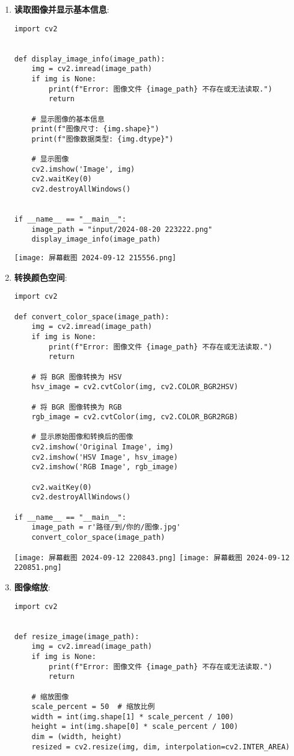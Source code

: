 \documentclass{ctexart}
\begin{document}
\begin{enumerate}[label=\arabic*.]
\item \textbf{读取图像并显示基本信息}:
\begin{lstlisting}
import cv2


def display_image_info(image_path):
    img = cv2.imread(image_path)
    if img is None:
        print(f"Error: 图像文件 {image_path} 不存在或无法读取.")
        return

    # 显示图像的基本信息
    print(f"图像尺寸: {img.shape}")
    print(f"图像数据类型: {img.dtype}")

    # 显示图像
    cv2.imshow('Image', img)
    cv2.waitKey(0)
    cv2.destroyAllWindows()


if __name__ == "__main__":
    image_path = "input/2024-08-20 223222.png"
    display_image_info(image_path)
\end{lstlisting}
\texttt{[image: 屏幕截图 2024-09-12 215556.png]}
\item \textbf{转换颜色空间}:
\begin{lstlisting}
import cv2

def convert_color_space(image_path):
    img = cv2.imread(image_path)
    if img is None:
        print(f"Error: 图像文件 {image_path} 不存在或无法读取.")
        return
    
    # 将 BGR 图像转换为 HSV
    hsv_image = cv2.cvtColor(img, cv2.COLOR_BGR2HSV)
    
    # 将 BGR 图像转换为 RGB
    rgb_image = cv2.cvtColor(img, cv2.COLOR_BGR2RGB)
    
    # 显示原始图像和转换后的图像
    cv2.imshow('Original Image', img)
    cv2.imshow('HSV Image', hsv_image)
    cv2.imshow('RGB Image', rgb_image)
    
    cv2.waitKey(0)
    cv2.destroyAllWindows()

if __name__ == "__main__":
    image_path = r'路径/到/你的/图像.jpg'
    convert_color_space(image_path)
\end{lstlisting}
\texttt{[image: 屏幕截图 2024-09-12 220843.png]}
\texttt{[image: 屏幕截图 2024-09-12 220851.png]}
\item \textbf{图像缩放}:
\begin{lstlisting}
import cv2


def resize_image(image_path):
    img = cv2.imread(image_path)
    if img is None:
        print(f"Error: 图像文件 {image_path} 不存在或无法读取.")
        return

    # 缩放图像
    scale_percent = 50  # 缩放比例
    width = int(img.shape[1] * scale_percent / 100)
    height = int(img.shape[0] * scale_percent / 100)
    dim = (width, height)
    resized = cv2.resize(img, dim, interpolation=cv2.INTER_AREA)


\end{lstlisting}
\end{enumerate}
\end{document}
